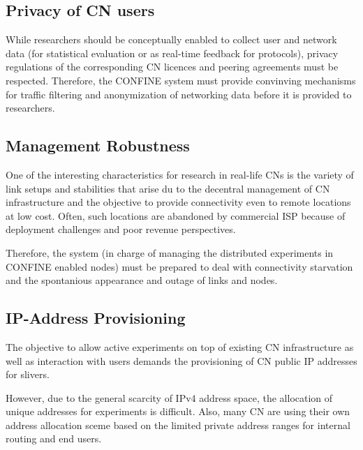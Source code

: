 \documentclass[conference]{IEEEtran}
\begin{document}
\subsection{Privacy of CN users}

While researchers should be conceptually enabled to collect user
and network data (for statistical evaluation or as real-time feedback
for protocols), privacy regulations of the corresponding CN licences
and peering agreements must be respected.
Therefore, the CONFINE system must provide convinving mechanisms for
traffic filtering and anonymization of networking data before it is
provided to researchers.

\subsection{Management Robustness}

One of the interesting characteristics for research in real-life CNs
is the variety of link setups and stabilities that arise du to the
decentral management of CN infrastructure and the objective to provide
connectivity even to remote locations at low cost. Often, such
locations are abandoned by commercial ISP because of deployment
challenges and poor revenue perspectives.

Therefore, the system (in charge of managing the distributed
experiments in CONFINE enabled nodes) must be prepared to deal with
connectivity starvation and the spontanious appearance and outage of
links and nodes.


\subsection{IP-Address Provisioning}

The objective to allow active experiments on top of existing CN
infrastructure as well as interaction with users demands the
provisioning of CN public IP addresses for slivers.

However, due to the general scarcity of IPv4 address space, the
allocation of unique addresses for experiments is difficult. Also,
many CN are using their own address allocation sceme based on the
limited private address ranges for internal routing and end users.
\end{document}
